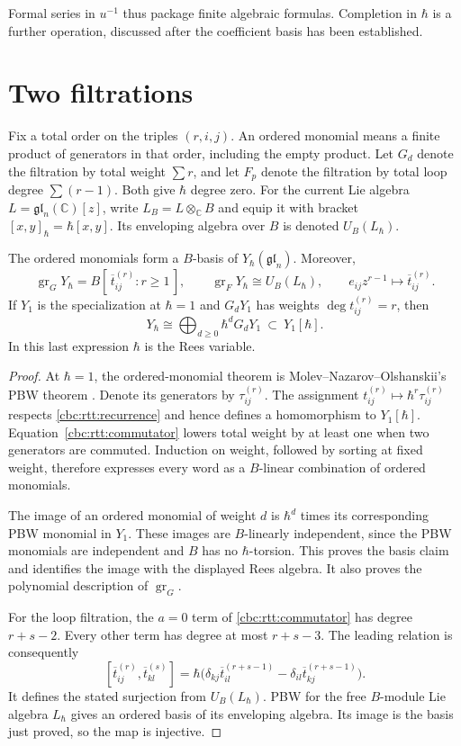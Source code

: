 Formal series in $u^{-1}$ thus package finite algebraic formulas.
Completion in $\hbar$ is a further operation, discussed after the
coefficient basis has been established.

\section{Two filtrations}

Fix a total order on the triples $(r,i,j)$.  An ordered monomial means
a finite product of generators in that order, including the empty
product.  Let $G_d$ denote the filtration by total weight
$\sum r$, and let $F_p$ denote the filtration by total loop degree
$\sum(r-1)$.  Both give $\hbar$ degree zero.
For the current Lie algebra $L=\mathfrak{gl}_n(\mathbb C)[z]$, write
$L_B=L\otimes_{\mathbb C}B$ and equip it with bracket
$[x,y]_\hbar=\hbar[x,y]$.  Its enveloping algebra over $B$ is denoted
$U_B(L_\hbar)$.

\begin{theorem}\label{cbc:rtt:pbw}
The ordered monomials form a $B$-basis of $Y_\hbar(\mathfrak{gl}_n)$.
Moreover,
\[
 \operatorname{gr}_G Y_\hbar
   =B[\,\overline t_{ij}^{(r)}:r\geq1\,],\qquad
 \operatorname{gr}_F Y_\hbar\cong U_B(L_\hbar),\qquad
 e_{ij}z^{r-1}\longmapsto\overline t_{ij}^{(r)}.
\]
If $Y_1$ is the specialization at $\hbar=1$ and $G_dY_1$ has weights
$\deg t_{ij}^{(r)}=r$, then
\[
 Y_\hbar\cong\bigoplus_{d\geq0}\hbar^dG_dY_1
 \ \subset\ Y_1[\hbar].
\]
In this last expression $\hbar$ is the Rees variable.
\end{theorem}
\begin{proof}
At $\hbar=1$, the ordered-monomial theorem is
Molev--Nazarov--Olshanskii's PBW theorem
\cite[Theorem~1.22]{MNOYangians}.  Denote its generators by
$\tau_{ij}^{(r)}$.  The assignment
$t_{ij}^{(r)}\mapsto\hbar^r\tau_{ij}^{(r)}$ respects
\eqref{cbc:rtt:recurrence} and hence defines a homomorphism to
$Y_1[\hbar]$.  Equation~\eqref{cbc:rtt:commutator} lowers total weight
by at least one when two generators are commuted.  Induction on weight,
followed by sorting at fixed weight, therefore expresses every word as
a $B$-linear combination of ordered monomials.

The image of an ordered monomial of weight $d$ is $\hbar^d$ times its
corresponding PBW monomial in $Y_1$.  These images are $B$-linearly
independent, since the PBW monomials are independent and $B$ has no
$\hbar$-torsion.  This proves the basis claim and identifies the image
with the displayed Rees algebra.  It also proves the polynomial
description of $\operatorname{gr}_G$.

For the loop filtration, the $a=0$ term of
\eqref{cbc:rtt:commutator} has degree $r+s-2$.  Every other term has
degree at most $r+s-3$.  The leading relation is consequently
\[
 [\overline t_{ij}^{(r)},\overline t_{kl}^{(s)}]
 =\hbar\bigl(\delta_{kj}\overline t_{il}^{(r+s-1)}
             -\delta_{il}\overline t_{kj}^{(r+s-1)}\bigr).
\]
It defines the stated surjection from $U_B(L_\hbar)$.
PBW for the free $B$-module Lie algebra $L_\hbar$ gives an ordered basis
of its enveloping algebra.  Its image is the basis just proved, so the
map is injective.
\end{proof}

